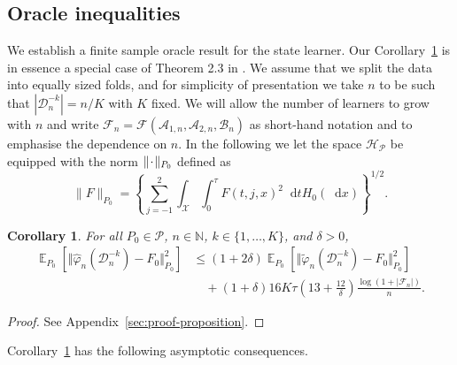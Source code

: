\documentclass[unnumsec,webpdf,contemporary,large,namedate]{oup-authoring-template}%
\theoremstyle{thmstyleone}%
\newtheorem{corollary}{Corollary}
\theoremstyle{thmstyletwo}%
\theoremstyle{thmstylethree}%
\DeclareMathOperator{\E}{\mathbb{E}} %
\newcommand{\N}{\mathbb{N}}
\newcommand{\blank}{\makebox[1ex]{\textbf{$\cdot$}}}
\renewcommand{\phi}{\varphi}
\newcommand*\diff{\mathop{}\!\mathrm{d}}
\newcommand{\1}{\mathds{1}}
\newcommand{\data}{\ensuremath{\mathcal{D}}}
\begin{document}
\subsection{Oracle inequalities}
\label{sec:finite-sample-oracle}

We establish a finite sample oracle result for the state learner. Our
Corollary~\ref{cor:oracle-prop} is in essence a special case of
Theorem 2.3 in \citep{vaart2006oracle}.  We assume that we split the
data into equally sized folds, and for simplicity of presentation we
take \( n \) to be such that \( |\data_n^{-k}| = n/K \) with \( K \)
fixed. We will allow the number of learners to grow with \( n \) and
write
\( \mathcal{F}_n=\mathcal{F}(\mathcal{A}_{1,n}, \mathcal{A}_{2,n},
\mathcal{B}_n)\) as short-hand notation and to emphasise the
dependence on \( n \).
In the following we let the space \( \mathcal{H}_{\mathcal{P}} \) be equipped with the norm
\( \| \blank \|_{P_0} \) defined as
\begin{equation}
  \label{eq:norm}
  \| F \|_{P_0} = 
  \left\{
    \sum_{j=-1}^{2}\int_{\mathcal{X}} \int_0^{\tau} F(t, j, x)^2 \diff t H_0( \diff x)
  \right\}^{1/2}.
\end{equation}

\begin{corollary}
  \label{cor:oracle-prop}
  For all \(P_0\in\mathcal{P}\), \( n \in \N \), \( k \in \{1, \dots, K\} \),
  and $\delta>0$,
  \begin{align*}
    \E_{P_0}{\left[ \Vert \hat{\phi}_n(\data_n^{-k}) - F_0 \Vert_{P_0}^2 \right]}
    & \leq (1 + 2\delta)
      \E_{P_0}{\left[ \Vert \tilde{\phi}_n(\data_n^{-k}) - F_0 \Vert_{P_0}^2 \right]}
    \\
    & \quad
      + (1+ \delta) 16   K \tau
      \left(
      13 + \frac{12}{\delta}
      \right)
      \frac{\log(1 + |\mathcal{F}_n|)}{n}.
  \end{align*}
\end{corollary}
\begin{proof}
  See Appendix~\ref{sec:proof-proposition}.
\end{proof}

Corollary~\ref{cor:oracle-prop} has the following asymptotic consequences.
\end{document}

